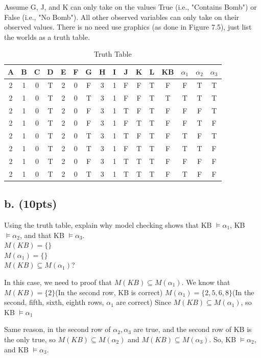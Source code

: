 \documentclass{article}
\begin{document}
\noindent Assume G, J, and K can only take on the values True (i.e., "Contains Bomb") or False (i.e., "No Bomb"). All other observed variables can only take on their observed values. There is no need use graphics (as done in Figure 7.5), just list the worlds as a truth table.


\begin{table}[ht]
    \centering
    \begin{tabular}{c|c|c|c|c|c|c|c|c|c|c|c|c|c|c|c}
    A & B & C & D & E & F & G & H & I & J & K & L & KB & $\alpha_1$ & $\alpha_2$ & $\alpha_3$ \\ \hline
    2 & 1 & 0 & T & 2 & 0 & F & 3 & 1 & F & F & T & F & F & T & T\\ \hline
    2 & 1 & 0 & T & 2 & 0 & T & 3 & 1 & F & F & T & T & T & T & T\\ \hline
    2 & 1 & 0 & T & 2 & 0 & F & 3 & 1 & T & F & T & F & F & F & T\\ \hline
    2 & 1 & 0 & T & 2 & 0 & F & 3 & 1 & F & T & T & F & F & T & F\\ \hline
    2 & 1 & 0 & T & 2 & 0 & T & 3 & 1 & T & F & T & F & T & F & T\\ \hline
    2 & 1 & 0 & T & 2 & 0 & T & 3 & 1 & F & T & T & F & T & T & F\\ \hline
    2 & 1 & 0 & T & 2 & 0 & F & 3 & 1 & T & T & T & F & F & F & F\\ \hline
    2 & 1 & 0 & T & 2 & 0 & T & 3 & 1 & T & T & T & F & T & F & F
\end{tabular}
    \caption{Truth Table}
    \label{tab:my_label}
\end{table}

\subsection{b. (10pts)} Using the truth table, explain why model checking shows that KB $\models \alpha_1$, KB $\models \alpha_2$, and that KB $\models \alpha_3$.\\

$M(KB) = \{ \}$ \\
$M(\alpha_1) = \{ \}$ \\
$M(KB) \subseteq M(\alpha_1)$?

In this case, we need to proof that $M(KB) \subseteq M(\alpha_1)$. We know that $M(KB) = \{2\}$(In the second row, KB is correct) $M(\alpha_1) = \{2,5,6,8\}$(In the second, fifth, sixth, eighth rows, $\alpha_1$ are correct)
Since $M(KB) \subseteq M(\alpha_1)$, so KB $\models \alpha_1$

Same reason, in the second row of $\alpha_2, \alpha_3$ are true, and the second row of KB is the only true, so $M(KB) \subseteq M(\alpha_2)$ and $M(KB) \subseteq M(\alpha_3)$. So, KB $\models \alpha_2$, and KB $\models \alpha_3$.\\
\end{document}
